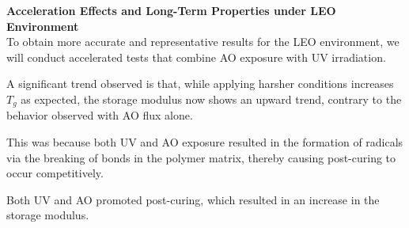 \documentclass[10pt]{beamer}
\begin{document}
\begin{frame}
\textbf{Acceleration Effects and Long-Term Properties under LEO Environment}\\
To obtain more accurate and representative results for the LEO environment, we will conduct accelerated tests that combine AO exposure with UV irradiation.\newline 

A significant trend observed is that, while applying harsher conditions increases $T_g$ as expected, the storage modulus now shows an upward trend, contrary to the behavior observed with AO flux alone.

This was because both UV and AO exposure
resulted in the formation of radicals via the breaking of bonds in the polymer matrix,
thereby causing post-curing to occur competitively.\newline 

Both UV and AO promoted post-curing, which resulted in an increase in
the storage modulus.

\end{frame}

\begin{frame}
\begin{figure}[H]
\centering
{}\hfill
{}
\label{fig:main_figure}
\end{figure}
\end{frame}
\end{document}
